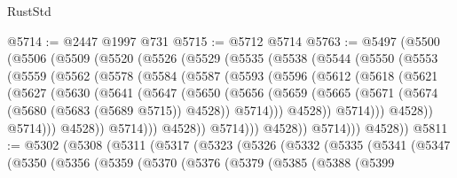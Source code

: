\begin{lexlean}{RustStd}
\begin{coremodule}
@5714 := @2447 @1997 @731
@5715 := @5712 @5714
@5763 := @5497
    (@5500
      (@5506
        (@5509
          (@5520
            (@5526
              (@5529
                (@5535
                  (@5538
                    (@5544
                      (@5550
                        (@5553
                          (@5559
                            (@5562
                              (@5578
                                (@5584
                                  (@5587
                                    (@5593
                                      (@5596
                                        (@5612
                                          (@5618
                                            (@5621
                                              (@5627
                                                (@5630
                                                  (@5641
                                                    (@5647
                                                      (@5650
                                                        (@5656
                                                          (@5659
                                                            (@5665
                                                              (@5671
                                                                (@5674
                                                                  (@5680
                                                                    (@5683 (@5689 @5715))
                                                                    @4528))
                                                                @5714)))
                                                          @4528))
                                                      @5714)))
                                                @4528))
                                            @5714)))
                                      @4528))
                                  @5714)))
                            @4528))
                        @5714)))
                  @4528))
              @5714)))
        @4528))
@5811 := @5302
    (@5308
      (@5311
        (@5317
          (@5323
            (@5326
              (@5332
                (@5335
                  (@5341
                    (@5347
                      (@5350
                        (@5356
                          (@5359
                            (@5370
                              (@5376
                                (@5379
                                  (@5385
                                    (@5388
                                      (@5399

\end{coremodule}
\end{lexlean}
